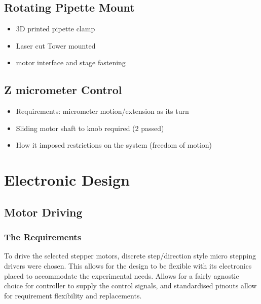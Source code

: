 \subsection{Rotating Pipette Mount}

\begin{itemize}
    \item 3D printed pipette clamp
    \item Laser cut Tower mounted
    \item motor interface and stage fastening  
\end{itemize}

\subsection{Z micrometer Control}
\begin{itemize}
    \item Requirements: micrometer motion/extension as its turn
    \item Sliding motor shaft to knob required (2 passed)
    \item How it imposed restrictions on the system (freedom of motion)  
\end{itemize}

\section{Electronic Design}

\subsection{Motor Driving}

\subsubsection*{The Requirements}
To drive the selected stepper motors, discrete step/direction style micro stepping drivers were chosen. This allows for the design to be flexible with its electronics placed to accommodate the experimental needs. Allows for a fairly agnostic choice for controller to supply the control signals, and standardised pinouts allow for requirement flexibility and replacements.


